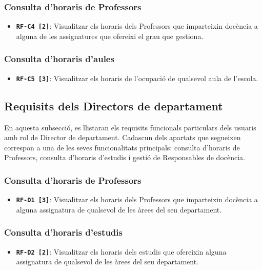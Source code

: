 \documentclass[a4paper,12pt]{ThesisStyle}
\begin{document}
\subsubsection{Consulta d'horaris de Professors}
\begin{itemize}
  \item \texttt{\textbf{RF-C4 [2]}}: Visualitzar els horaris dels Professors que imparteixin docència a alguna de les assignatures que ofereixi el grau que gestiona.
\end{itemize}

\subsubsection{Consulta d'horaris d'aules}
\begin{itemize}
  \item \texttt{\textbf{RF-C5 [3]}}: Visualitzar els horaris de l'ocupació de qualsevol aula de l'escola.
\end{itemize}


\subsection{Requisits dels Directors de departament}
\label{subsec:requisits_director_departament}

En aquesta subsecció, es llistaran els requisits funcionals particulars dels usuaris amb rol de Director de departament. Cadascun dels apartats que segueixen correspon a una de les seves funcionalitats principals: consulta d'horaris de Professors, consulta d'horaris d'estudis i gestió de Responsables de docència.

\subsubsection{Consulta d'horaris de Professors}
\begin{itemize}
  \item \texttt{\textbf{RF-D1 [3]}}: Visualitzar els horaris dels Professors que imparteixin docència a alguna assignatura de qualsevol de les àrees del seu departament.
\end{itemize}

\subsubsection{Consulta d'horaris d'estudis}
\begin{itemize}
  \item \texttt{\textbf{RF-D2 [2]}}: Visualitzar els horaris dels estudis que ofereixin alguna assignatura de qualsevol de les àrees del seu departament.
\end{itemize}
\end{document}
